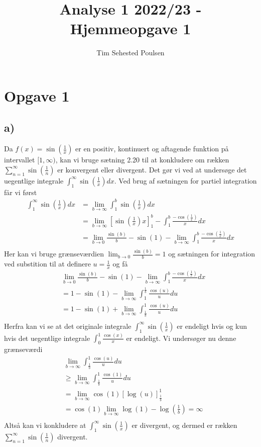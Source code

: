 \documentclass{article}
\title{Analyse 1 2022/23 - Hjemmeopgave 1}
\author{Tim Sehested Poulsen}
\newcommand{\lrb}[1]{\left[ #1\right]}
\begin{document}
\section*{Opgave 1}
\subsection*{a)}
Da $f(x) = \sin(\frac{1}{x})$ er en positiv, kontinuert og aftagende 
funktion på intervallet $[1, \infty)$, kan vi bruge sætning 2.20 til at 
konkludere om rækken $\sum_{n=1}^{\infty} \sin(\frac{1}{n})$ er konvergent eller divergent.
Det gør vi ved at undersøge det uegentlige integrale $\int_1^\infty \sin(\frac{1}{x}) dx$. 
Ved brug af sætningen for partiel integration\cite[sætning 5.35]{an0} får vi først
\begin{align*}
    \int_1^\infty \sin(\frac{1}{x}) dx &= \lim_{b \to \infty} \int_1^b \sin(\frac{1}{x}) dx \\
    &= \lim_{b \to \infty} \lrb{\sin(\frac{1}{x})x}_1^{b} - \int_1^b \frac{-\cos(\frac{1}{x})}{x} dx \\ 
    &= \lim_{b \to 0} \frac{\sin(b)}{b} - \sin(1) - \lim_{b \to \infty}\int_1^b \frac{-\cos(\frac{1}{x})}{x} dx \\ 
\end{align*}
Her kan vi bruge grænseværdien $\lim_{b \to 0} \frac{\sin(b)}{b} = 1$
og sætningen for integration ved substition\cite[sætning 5.39]{an0} 
til at definere $u=\frac{1}{x}$ og få
\begin{align*}
    &\lim_{b \to 0} \frac{\sin(b)}{b} - \sin(1) - \lim_{b \to \infty}\int_1^b \frac{-\cos(\frac{1}{x})}{x} dx \\ 
    &= 1 - \sin(1) -  \lim_{b \to \infty} \int_1^{\frac{1}{b}} \frac{\cos(u)}{u} du \\ 
    &= 1 - \sin(1) +  \lim_{b \to \infty} \int_{\frac{1}{b}}^1 \frac{\cos(u)}{u} du \\
\end{align*}
Herfra kan vi se at det originale integrale $\int_1^{\infty} \sin(\frac{1}{x})$ 
er endeligt hvis og kun hvis det uegentlige integrale
$\int_0^1{\frac{\cos(x)}{x}}$ er endeligt. Vi undersøger nu denne grænseværdi
\begin{align*}
&\lim_{b \to \infty} \int_{\frac{1}{b}}^1 \frac{\cos(u)}{u} du \\
&\ge \lim_{b \to \infty} \int_{\frac{1}{b}}^1 \frac{\cos(1)}{u} du \\
&= \lim_{b \to \infty} \cos(1) \lrb{\log(u)}_{\frac{1}{b}}^1 \\
&= \cos(1) \lim_{b \to \infty} \log(1) - \log(\frac{1}{b}) = \infty \\
\end{align*}
Altså kan vi konkludere at $\int_1^{\infty} \sin(\frac{1}{x})$ er divergent, og dermed
er rækken $\sum_{n=1}^{\infty} \sin(\frac{1}{n})$ divergent.
\end{document}
